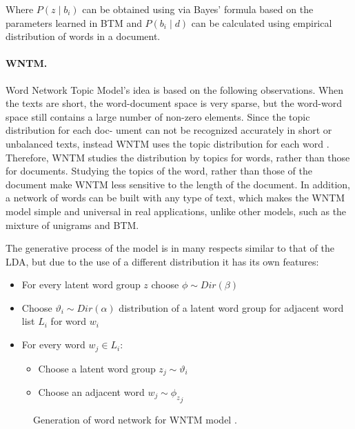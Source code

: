 Where \(P (z \mid b_i)\) can be obtained using via Bayes’ formula based on the parameters learned in BTM and \(P(b_i \mid d)\) can be calculated using empirical distribution of words in a document.

\paragraph{WNTM.} Word Network Topic Model’s idea is based on the following observations. When the texts are short, the word-document space is very sparse, but the word-word space still contains a large number of non-zero elements. Since the topic distribution for each doc- ument can not be recognized accurately in short or unbalanced texts, instead WNTM uses the topic distribution for each word \cite{KeYuanJichang}. Therefore, WNTM studies the distribution by topics for words, rather than those for documents. Studying the topics of the word, rather than those of the document make WNTM less sensitive to the length of the document. In addition, a network of words can be built with any type of text, which makes the WNTM model simple and universal in real applications, unlike other models, such as the mixture of unigrams \cite{ThrunMitchellNigam} and BTM.

The generative process of the model is in many respects similar to that of the LDA, but due to the use of a different distribution it has its own features:
\begin{itemize}
	\item For every latent word group \(z\) choose \(\phi \sim Dir(\beta)\)
	\item Choose \(\vartheta_i \sim \textit{Dir}(\alpha)\) distribution of a latent word group for adjacent word list \(L_i\) for word \(w_i\)
	\item For every word \(w_j \in L_i\):
	\begin{itemize}
		\item Choose a latent word group \(z_j \sim \vartheta_i\) 
		\item Choose an adjacent word \(w_j \sim {\phi_z}_j\)
	\end{itemize}
\end{itemize}

\begin{figure}[ht]
	\caption{Generation of word network for WNTM model \cite{KeYuanJichang}.}\label{fig:wntmGeneration}
\end{figure}

